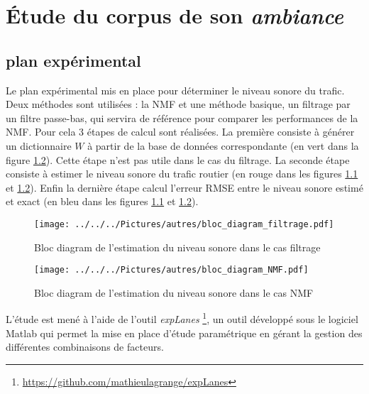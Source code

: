 %
%
%
%
%
\chapter{\'Etude du corpus de son \textit{ambiance}}

\section{plan expérimental}

Le plan expérimental mis en place pour déterminer le niveau sonore du trafic. Deux méthodes sont utilisées : la NMF et une méthode basique, un filtrage par un filtre passe-bas, qui servira de référence pour comparer les performances de la NMF. Pour cela 3 étapes de calcul sont réalisées. La première consiste à générer un dictionnaire $W$ à partir de la base de données correspondante (en vert dans la figure \ref{fig:bloc_diag_nmf}). Cette étape n'est pas utile dans le cas du filtrage. La seconde étape consiste à estimer le niveau sonore du trafic routier (en rouge dans les figures \ref{fig:bloc_diag_filtre} et \ref{fig:bloc_diag_nmf}). Enfin la dernière étape calcul l'erreur RMSE entre le niveau sonore estimé et exact (en bleu dans les figures \ref{fig:bloc_diag_filtre} et \ref{fig:bloc_diag_nmf}). \\

\begin{figure}[t]
\centering
\texttt{[image: ../../../Pictures/autres/bloc\_diagram\_filtrage.pdf]}
\caption{Bloc diagram de l'estimation du niveau sonore dans le cas  \og filtrage \fg{}}
\label{fig:bloc_diag_filtre}
\end{figure}

\begin{figure}[t]
\centering
\texttt{[image: ../../../Pictures/autres/bloc\_diagram\_NMF.pdf]}
\caption{Bloc diagram de l'estimation du niveau sonore dans le cas \og NMF \fg{}}
\label{fig:bloc_diag_nmf}
\end{figure}



L'étude est mené à l'aide de l'outil \textit{expLanes} \footnote{\url{https://github.com/mathieulagrange/expLanes}}, un outil développé sous le logiciel Matlab qui permet la mise en place d'étude paramétrique en gérant la gestion des différentes combinaisons de facteurs.\\

